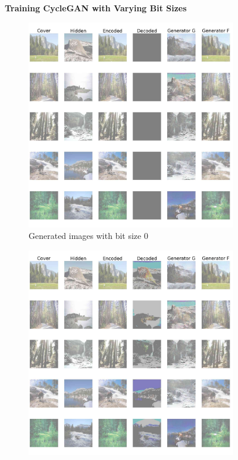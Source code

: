 \documentclass[conference]{IEEEtran}
\begin{document}
\begin{figure}[!hbt]
\centering
\textbf{Training CycleGAN with Varying Bit Sizes}\par\medskip
    \begin{subfigure}[b]{0.26\textwidth}
    \centering
            \includegraphics[scale=0.07]{images/bit_size_training_0.jpg}
            \caption{Generated images with bit size 0}
            \label{bit_size_0}
    \end{subfigure}
    \hspace{0.05\textwidth}
    \begin{subfigure}[b]{0.26\textwidth}
    \centering
            \includegraphics[scale=0.07]{images/bit_size_training_1.jpg}

\end{subfigure}
\end{figure}
\end{document}
